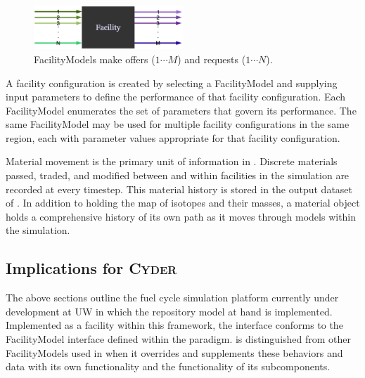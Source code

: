 \begin{figure}[htb!]
  \begin{center}
    \includegraphics[width=0.5\textwidth]{./chapters/paradigm/facility.eps}
  \end{center}
  \caption[\Cyclus FacilityModel offer and request interface.]{\Cyclus FacilityModels make offers ($1\cdots M$) and requests ($1\cdots N$).}
  \label{fig:facility}
\end{figure}


A facility configuration is created by selecting a FacilityModel and supplying 
input parameters to define the performance of that facility configuration.  
Each FacilityModel enumerates the set of parameters that govern its 
performance.  The same FacilityModel may be used for multiple facility 
configurations in the same region, each with parameter values appropriate for 
that facility configuration.



Material movement is the primary unit of information in \Cyclus.  
Discrete materials passed, traded, and modified between and within facilities 
in the simulation are recorded at every timestep.  This material 
history is stored in the output dataset of \Cyclus. In addition to 
holding the map of isotopes and their masses, a material object holds 
a comprehensive history of its own path as it moves through models 
within the simulation. 

\subsection{Implications for \textsc{Cyder}}

The above sections outline the \Cyclus fuel cycle simulation platform currently 
under development at \gls{UW} in which the \Cyder repository model at hand is 
implemented.  Implemented as a facility within this framework, the \Cyder 
interface conforms to the FacilityModel interface defined within the \Cyclus 
paradigm.  \Cyder is distinguished from other FacilityModels used in \Cyclus 
when it overrides and supplements these behaviors and data with its own 
functionality and the functionality of its subcomponents.

